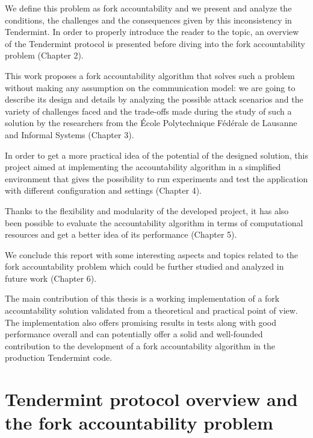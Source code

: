 \documentclass[a4paper,11pt,oneside]{report}
\begin{document}
We define this problem as fork accountability and we present and analyze the conditions, the challenges and the consequences given by this inconsistency in Tendermint. In order to properly introduce the reader to the topic, an overview of the Tendermint protocol is presented before diving into the fork accountability problem (Chapter 2). 

This work proposes a fork accountability algorithm that solves such a problem without making any assumption on the communication model: we are going to describe its design and details by analyzing the possible attack scenarios and the variety of challenges faced and the trade-offs made during the study of such a solution by the researchers from the École Polytechnique Fédérale de Lausanne and Informal Systems (Chapter 3). 

In order to get a more practical idea of the potential of the designed solution, this project aimed at implementing the accountability algorithm in a simplified environment that gives the possibility to run experiments and test the application with different configuration and settings (Chapter 4). 

Thanks to the flexibility and modularity of the developed project, it has also been possible to evaluate the accountability algorithm in terms of computational resources and get a better idea of its performance (Chapter 5). 

We conclude this report with some interesting aspects and topics related to the fork accountability problem which could be further studied and analyzed in future work (Chapter 6). 

The main contribution of this thesis is a working implementation of a fork accountability solution validated from a theoretical and practical point of view. The implementation also offers promising results in tests along with good performance overall and can potentially offer a solid and well-founded contribution to the development of a fork accountability algorithm in the production Tendermint code.

\chapter{Tendermint protocol overview and the fork accountability problem}
\end{document}
